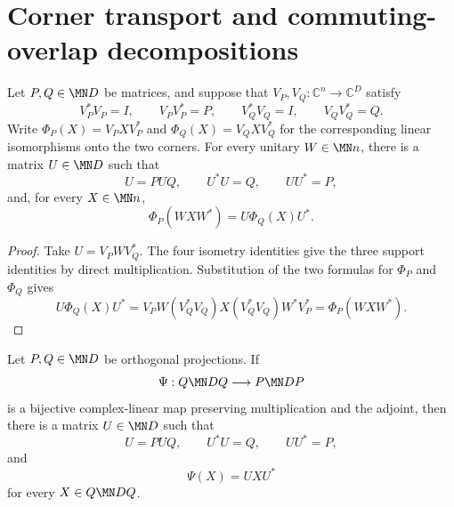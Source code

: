 \section{Corner transport and commuting-overlap decompositions}

\begin{theorem}%
    \label{thm:corner_compression_partial_isometry_transport}
    \leanok
    Let $P,Q\in\MN D$ be matrices, and suppose that
    $V_P,V_Q:\mathbb C^n\to\mathbb C^D$ satisfy
    \[
        V_P^*V_P=I,\qquad V_PV_P^*=P,\qquad
        V_Q^*V_Q=I,\qquad V_QV_Q^*=Q.
    \]
    Write $\Phi_P(X)=V_PXV_P^*$ and $\Phi_Q(X)=V_QXV_Q^*$ for the
    corresponding linear isomorphisms onto the two corners. For every unitary
    $W\in\MN n$, there is a matrix $U\in\MN D$ such that
    \[
        U=PUQ,\qquad U^*U=Q,\qquad UU^*=P,
    \]
    and, for every $X\in\MN n$,
    \[
        \Phi_P(WXW^*)=U\Phi_Q(X)U^*.
    \]
\end{theorem}

\begin{proof}\leanok
    Take $U=V_PWV_Q^*$. The four isometry identities give the three support
    identities by direct multiplication. Substitution of the two formulas
    for $\Phi_P$ and $\Phi_Q$ gives
    \[
        U\Phi_Q(X)U^*
        =V_PW(V_Q^*V_Q)X(V_Q^*V_Q)W^*V_P^*
        =\Phi_P(WXW^*).
    \]
\end{proof}

\begin{theorem}%
    \label{thm:corner_star_isomorphism_partial_isometry}
    \leanok
    Let $P,Q\in\MN D$ be orthogonal projections. If
    \[
        \Psi:Q\MN DQ\longrightarrow P\MN DP
    \]
    is a bijective complex-linear map preserving multiplication and the
    adjoint, then there is a matrix $U\in\MN D$ such that
    \[
        U=PUQ,\qquad U^*U=Q,\qquad UU^*=P,
    \]
    and
    \[
        \Psi(X)=UXU^*
    \]
    for every $X\in Q\MN DQ$.
\end{theorem}

